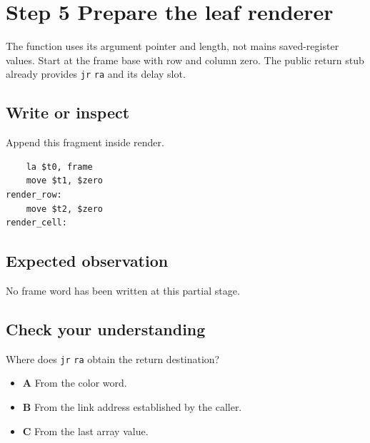 \section{Step 5 Prepare the leaf
  renderer}\label{009-sorting-visualizer-s05-step-5-prepare-the-leaf-renderer}

The function uses its argument pointer and length, not
main\textquotesingle s saved-register values. Start at the frame base
with row and column zero. The public return stub already provides
\texttt{jr} \texttt{ra} and its delay slot.

\subsection{Write or
  inspect}\label{009-sorting-visualizer-s05-write-or-inspect}

Append this fragment inside render.

\begin{verbatim}
    la $t0, frame
    move $t1, $zero
render_row:
    move $t2, $zero
render_cell:
\end{verbatim}

\subsection{Expected
  observation}\label{009-sorting-visualizer-s05-expected-observation}

No frame word has been written at this partial stage.

\subsection{Check your
  understanding}\label{009-sorting-visualizer-s05-check-your-understanding}

Where does \texttt{jr} \texttt{ra} obtain the return destination?

\begin{itemize}
  \tightlist
  \item
        \textbf{A} From the color word.
  \item
        \textbf{B} From the link address established by the caller.
  \item
        \textbf{C} From the last array value.
\end{itemize}
